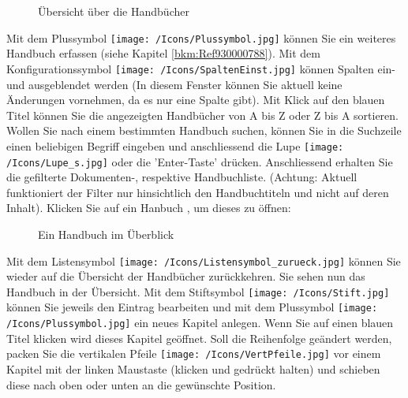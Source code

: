 \begin{figure}[H]
\caption{Übersicht über die Handbücher}
\end{figure}

Mit dem Plussymbol \texttt{[image: /Icons/Plussymbol.jpg]}  können Sie ein weiteres Handbuch erfassen (siehe Kapitel \ref{bkm:Ref930000788}). Mit dem Konfigurationssymbol \texttt{[image: /Icons/SpaltenEinst.jpg]}  können Spalten ein- und ausgeblendet werden (In diesem Fenster können Sie aktuell keine Änderungen vornehmen, da es nur eine Spalte gibt). Mit Klick auf den blauen Titel  können Sie die angezeigten Handbücher von A bis Z oder Z bis A sortieren. Wollen Sie nach einem bestimmten Handbuch suchen, können Sie in die Suchzeile  einen beliebigen Begriff eingeben und anschliessend die Lupe \texttt{[image: /Icons/Lupe\_s.jpg]} oder die 'Enter-Taste' drücken. Anschliessend erhalten Sie die gefilterte Dokumenten-, respektive Handbuchliste. (Achtung: Aktuell funktioniert der Filter nur hinsichtlich den Handbuchtiteln und nicht auf deren Inhalt). Klicken Sie auf ein Hanbuch , um dieses zu öffnen:

\begin{figure}[H]
\caption{Ein Handbuch im Überblick}
\end{figure}

Mit dem Listensymbol \texttt{[image: /Icons/Listensymbol\_zurueck.jpg]}  können Sie wieder auf die Übersicht der Handbücher zurückkehren. Sie sehen nun das Handbuch in der Übersicht. Mit dem Stiftsymbol \texttt{[image: /Icons/Stift.jpg]}  können Sie jeweils den Eintrag bearbeiten und mit dem Plussymbol \texttt{[image: /Icons/Plussymbol.jpg]}  ein neues Kapitel anlegen. Wenn Sie auf einen blauen Titel klicken  wird dieses Kapitel geöffnet. Soll die Reihenfolge geändert werden, packen Sie die vertikalen Pfeile \texttt{[image: /Icons/VertPfeile.jpg]}  vor einem Kapitel mit der linken Maustaste (klicken und gedrückt halten) und schieben diese nach oben oder unten an die gewünschte Position.

